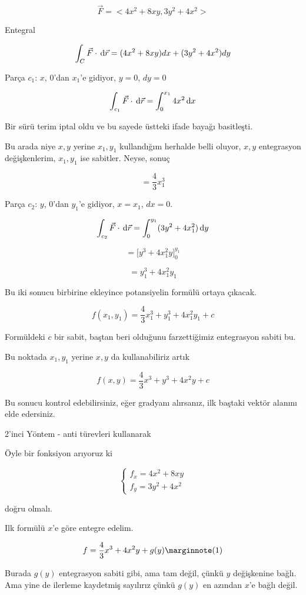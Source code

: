 \documentclass[12pt,fleqn]{article}\usepackage{../../common}
\begin{document}
$$ \vec{F} = <4x^2 + 8xy, 3y^2 + 4x^2>$$

Entegral

$$ \int_C \vec{F} \cdot \,\mathrm{d}\vec{r} = 
(4x^2 + 8xy) dx + (3y^2 + 4x^2) dy
$$

Parça $c_1$: $x$, 0'dan $x_1$'e gidiyor, $y=0$, $dy = 0$

$$
\int_{c_1} \vec{F} \cdot \,\mathrm{d}\vec{r} =  \int_0^{x_1} 4x^2 \,\mathrm{d} x 
$$

Bir sürü terim iptal oldu ve bu sayede üstteki ifade bayağı basitleşti. 

Bu arada niye $x,y$ yerine $x_1,y_1$ kullandığım herhalde belli oluyor,
$x,y$ entegrasyon değişkenlerim, $x_1,y_1$ ise sabitler. Neyse, sonuç

$$ = \frac{4}{3} x_1^3$$

Parça $c_2$: $y$, 0'dan $y_1$'e gidiyor, $x=x_1$, $dx = 0$. 

$$
\int_{c_2} \vec{F} \cdot \,\mathrm{d}\vec{r} = 
\int_0^{y_1} (3y^2 + 4x_1^2) \,\mathrm{d} y
$$

$$ = \bigg[ y^3 + 4x_1^2y \bigg]_0^{y_1} $$

$$ = y_1^3 + 4x_1^2y_1 $$

Bu iki sonucu birbirine ekleyince potansiyelin formülü ortaya çıkacak.

$$ f(x_1,y_1) = \frac{4}{3} x_1^3 + y_1^3 + 4x_1^2y_1 + c$$

Formüldeki $c$ bir sabit, baştan beri olduğunu farzettiğimiz entegrasyon
sabiti bu. 

Bu noktada $x_1,y_1$ yerine $x,y$ da kullanabiliriz artık

$$ f(x,y) = \frac{4}{3} x^3 + y^3 + 4x^2y + c$$

Bu sonucu kontrol edebilirsiniz, eğer gradyanı alırsanız, ilk baştaki vektör
alanını elde edersiniz.

2'inci Yöntem - anti türevleri kullanarak

Öyle bir fonksiyon arıyoruz ki 

$$ 
\left\{ \begin{array}{l}
f_x = 4x^2 + 8xy \\
f_y = 3y^2 + 4x^2
\end{array} \right.
$$

doğru olmalı. 

Ilk formülü $x$'e göre entegre edelim. 

$$ f = \frac{4}{3}x^3 + 4x^2y + g(y)
\mlabel{1}$$

Burada $g(y)$ entegrasyon sabiti gibi, ama tam değil, çünkü $y$ değişkenine
bağlı. Ama yine de ilerleme kaydetmiş sayılırız çünkü $g(y)$ en azından $x$'e
bağlı değil.
\end{document}
